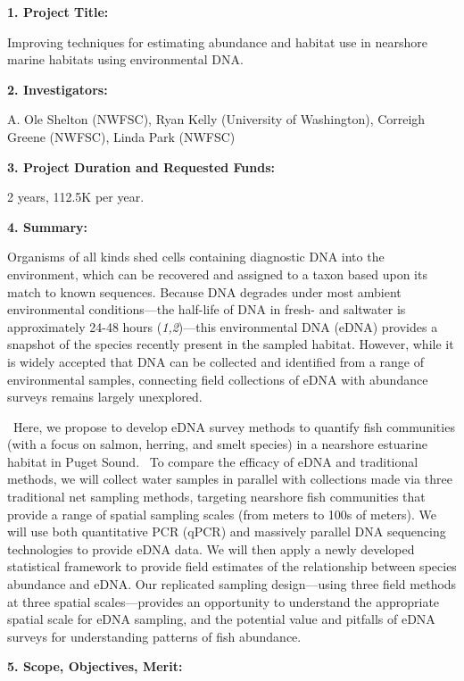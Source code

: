 \documentclass[]{article}
\date{}
\begin{document}
\textbf{1. Project Title:}{~}

Improving techniques for estimating abundance and habitat use in
nearshore marine habitats using environmental DNA.

\textbf{2. Investigators:{~}}

A. Ole Shelton (NWFSC), Ryan Kelly (University of Washington), Correigh
Greene (NWFSC), Linda Park (NWFSC)

\textbf{3. Project Duration and Requested Funds:{~}}

2 years, 112.5K per year.

\textbf{4. Summary:{~}}

Organisms of all kinds shed cells containing diagnostic DNA into the
environment, which can be recovered and assigned to a taxon based upon
its match to known sequences. Because DNA degrades under most ambient
environmental conditions---the half-life of DNA in fresh- and saltwater
is approximately 24-48 hours (\emph{1,2})---this environmental DNA
(eDNA) provides a snapshot of the species recently present in the
sampled habitat. However, while it is widely accepted that DNA can be
collected and identified from a range of environmental samples,
connecting field collections of eDNA with abundance surveys remains
largely unexplored.

{~}Here, we propose to develop eDNA survey methods to quantify fish
communities (with a focus on salmon, herring, and smelt species) in a
nearshore estuarine habitat in Puget Sound.{~ }To compare the efficacy
of eDNA and traditional methods, we will collect water samples in
parallel with collections made via three traditional net sampling
methods, targeting nearshore fish communities that provide a range of
spatial sampling scales (from meters to 100s of meters). We will use
both quantitative PCR (qPCR) and massively parallel DNA sequencing
technologies to provide eDNA data. We will then apply a newly developed
statistical framework to provide field estimates of the relationship
between species abundance and eDNA. Our replicated sampling
design---using three field methods at three spatial scales---provides an
opportunity to understand the appropriate spatial scale for eDNA
sampling, and the potential value and pitfalls of eDNA surveys for
understanding patterns of fish abundance.

\textbf{}

\textbf{5. Scope, Objectives, Merit:} {~}
\end{document}
